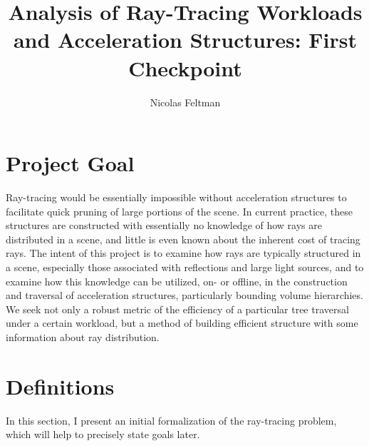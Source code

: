 \documentclass[twocolumn]{article}
\title{Analysis of Ray-Tracing Workloads and Acceleration Structures: First Checkpoint}
\author{Nicolas Feltman}
\begin{document}
\maketitle
\section{Project Goal}

Ray-tracing would be essentially impossible without acceleration structures to facilitate quick pruning of large portions of the scene. In current practice, these structures are constructed with essentially no knowledge of how  rays are distributed in a scene, and little is even known about the inherent cost of tracing rays. The intent of this project is to examine how rays are typically structured in a scene, especially those associated with reflections and large light sources, and to examine how this knowledge can be utilized, on- or offline, in the construction and traversal of acceleration structures, particularly bounding volume hierarchies.  We seek not only a robust metric of the efficiency of a particular tree traversal under a certain workload, but a method of building efficient structure with some information about ray distribution.  

\section{Definitions}
In this section, I present an initial formalization of the ray-tracing problem, which will help to precisely state goals later.
\end{document}
